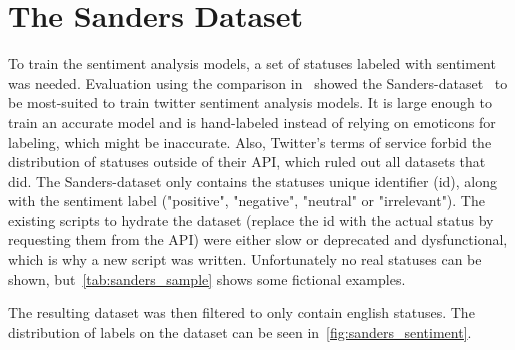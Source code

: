 \section{The Sanders Dataset}
\label{sec:theSandersDataset}

To train the sentiment analysis models, a set of statuses labeled with sentiment was needed.
Evaluation using the comparison in~\cite{Saif2013} showed the Sanders-dataset~\cite{sanders} to be most-suited to train twitter sentiment analysis models.
It is large enough to train an accurate model and is hand-labeled instead of relying on emoticons for labeling, which might be inaccurate.
Also, Twitter's terms of service forbid the distribution of statuses outside of their API, which ruled out all datasets that did.
The Sanders-dataset only contains the statuses unique identifier (id), along with the sentiment label ("positive", "negative", "neutral" or "irrelevant").
The existing scripts to hydrate the dataset (replace the id with the actual status by requesting them from the API) were either slow or deprecated and dysfunctional,
which is why a new script was written.
Unfortunately no real statuses can be shown, but~\ref{tab:sanders_sample} shows some fictional examples.

\begin{table}
    \caption{Some fictional statuses with labels}
    \label{tab:sanders_sample}
\end{table}

The resulting dataset was then filtered to only contain english statuses.
The distribution of labels on the dataset can be seen in~\ref{fig:sanders_sentiment}.


